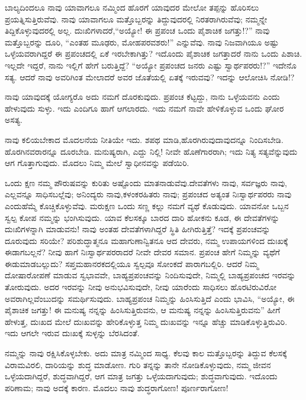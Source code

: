 ಬಾಲ್ಯದಿಂದಲೂ ನಾವು ಯಾವಾಗಲೂ ನಮ್ಮಿಂದ ಹೊರಗೆ ಯಾವುದರ ಮೇಲೋ ತಪ್ಪನ್ನು ಹೊರಿಸಲು ಪ್ರಯತ್ನಿಸುತ್ತಿರುವೆವು. ನಾವು ಯಾವಾಗಲೂ ಮತ್ತೊಬ್ಬರನ್ನು ತಿದ್ದುವುದರಲ್ಲಿ ನಿರತರಾಗಿರುವೆವು; ನಮ್ಮನ್ನೇ ತಿದ್ದಿಕೊಳ್ಳುವುದರಲ್ಲಿ ಅಲ್ಲ. ದುಃಖಿಗಳಾದರೆ,\break “ಅಯ್ಯೋ! ಈ ಪ್ರಪಂಚ ಒಂದು ಪೈಶಾಚಿಕ ಜಗತ್ತು!?” ನಾವು ಮತ್ತೊಬ್ಬರನ್ನು ದೂರಿ, “ಎಂತಹ ಮೂಢರು, ಮೋಹಪರವಶರು!'' ಎನ್ನುವೆವು. ನಾವು ನಿಜವಾಗಿಯೂ ಅಷ್ಟು ಒಳ್ಳೆಯವರಾಗಿದ್ದರೆ ಈ ಪ್ರಪಂಚದಲ್ಲಿ ಏಕೆ ಇರಬೇಕಾಗಿತ್ತು? ಇದೊಂದು ಪೈಶಾಚಿಕ ಜಗತ್ತಾದರೆ ನಾನು ಒಂದು ಪಿಶಾಚಿ. ಇಲ್ಲದೇ ಇದ್ದರೆ, ನಾನು ಇಲ್ಲಿಗೆ ಹೇಗೆ ಬರುತ್ತಿದ್ದೆ? “ಅಯ್ಯೋ ಪ್ರಪಂಚದ ಜನರು ಎಷ್ಟು ಸ್ವಾರ್ಥಪರರು!?” ಇದೇನೊ ಸತ್ಯ. ಆದರೆ ನಾವು ಅವರಿಗಿಂತ ಮೇಲಾದರೆ ಅವರ ಜೊತೆಯಲ್ಲಿ ಏತಕ್ಕೆ ಇರುವವು? ಇದನ್ನು ಆಲೋಚಿಸಿ ನೋಡಿ!?

ನಾವು ಯಾವುದಕ್ಕೆ ಯೋಗ್ಯರೊ ಅದು ನಮಗೆ ದೊರಕುವುದು. ಪ್ರಪಂಚ ಕೆಟ್ಟದ್ದು, ನಾನು ಒಳ್ಳೆಯವನು ಎಂದು ಹೇಳುವುದು ಸುಳ್ಳು. ಇದು ಎಂದಿಗೂ ಹಾಗೆ ಆಗಲಾರದು. ಇದು ನಮಗೆ ನಾವೇ ಹೇಳಿಕೊಳ್ಳುವ ಒಂದು ಘೋರ ಅಸತ್ಯ.

ನಾವು ಕಲಿಯಬೇಕಾದ ಮೊದಲನೆಯ ನೀತಿಯೇ ಇದು. ಶಪಥ ಮಾಡಿ,\break ಹೊರಗಿರುವುದಾವುದನ್ನೂ ನಿಂದಿಸಬೇಡಿ. ಹೊರಗಿನವರಾರನ್ನೂ ದೂರಬೇಡಿ. ಮನುಷ್ಯರಾಗಿ, ಎದ್ದು ನಿಲ್ಲಿ! ನೀವೇ ಹೊಣೆಗಾರರಾಗಿ; ಇದು ನಿತ್ಯ ಸತ್ಯವೆನ್ನುವುದು ಆಗ ಗೊತ್ತಾಗುವುದು. ಮೊದಲು ನಿಮ್ಮ ಮೇಲೆ ಸ್ವಾಧೀನವನ್ನು ಪಡೆಯಿರಿ.

ಒಂದು ಕ್ಷಣ ನಮ್ಮ ಪೌರುಷವನ್ನು ಕುರಿತು ಅಷ್ಟೊಂದು ಮಾತನಾಡುವೆವು.\break ದೇವತೆಗಳು ನಾವು, ಸರ್ವಜ್ಞರು ನಾವು, ಎಲ್ಲವನ್ನೂ ಸಾಧಿಸಬಲ್ಲೆವು; ಅನಿಂದ್ಯರು ನಾವು,\break ಕಳಂಕರಹಿತರು ನಾವು; ಪ್ರಪಂಚದ ಅತ್ಯಂತ ನಿಃಸ್ವಾರ್ಥಪರರು ನಾವು ಎಂದು\break ಹೆಮ್ಮೆ ಕೊಚ್ಚಿಕೊಳ್ಳುವೆವು. ಮರುಕ್ಷಣ ಒಂದು ಸಣ್ಣ ಕಲ್ಲು ನಮಗೆ ವ್ಯಥೆ ಕೊಡುವುದು. ಯಾವನೋ ಒಬ್ಬನ ಸ್ವಲ್ಪ ಕೋಪ ನಮ್ಮನ್ನು ಭಂಗಿಸುವುದು. ಯಾವ ಕೆಲಸಕ್ಕೂ ಬಾರದ ದಾರಿ ಹೋಕನು ಕೂಡ, ಈ ದೇವತೆಗಳನ್ನು ದುಃಖಿಗಳನ್ನಾಗಿ ಮಾಡುವನು! ನಾವು ಅಂತಹ ದೇವತೆಗಳಾಗಿದ್ದರೆ ಸ್ಥಿತಿ ಹೀಗಿರುತ್ತಿತ್ತೆ? ಇದಕ್ಕೆ ಪ್ರಪಂಚವನ್ನು ದೂರುವುದು ಸರಿಯೇ? ಪರಿಶುದ್ಧಾತ್ಮನೂ ಮಹಾಗುಣಾನ್ವಿತನೂ ಆದ ದೇವರು, ನಮ್ಮ ಉಪಾಯಗಳಿಂದ ದುಃಖಕ್ಕೆ ಈಡಾಗಬಲ್ಲನೆ? ನೀವು ಹಾಗೆ ನಿಃಸ್ವಾರ್ಥಪರರಾದರೆ ನೀವೇ ದೇವರ ಸಮಾನ. ಪ್ರಪಂಚ ಹೇಗೆ ನಿಮ್ಮನ್ನು ವ್ಯಥೆಗೆ ಈಡುಮಾಡಬಲ್ಲುದು? ಸಪ್ತಮಹಾನರಕದಲ್ಲಿಯೂ ಸ್ವಲ್ಪವೂ ಸೋಂಕದೆ ಪಾರಾಗಬಲ್ಲಿರಿ. ಆದರೆ ನಿಮ್ಮ ದೋಷಾರೋಪಣೆ ಮಾಡುವ ಸ್ವಭಾವವೇ, ಬಾಹ್ಯಪ್ರಪಂಚವನ್ನು ನಿಂದಿಸುವುದೇ, ನಿಮ್ಮಲ್ಲಿ ಬಾಹ್ಯಪ್ರಪಂಚದ ಇರವನ್ನು ತೋರುವುದು. ಅದರ ಇರವನ್ನು ನೀವು ಅನುಭವಿಸುವುದೇ, ನೀವು ಯಾರೆಂದು ಸಾಧಿಸಲು ಹೊರಟಿರುವಿರೋ ಅವರಾಗಿಲ್ಲವೆಂಬುದನ್ನು ಸಮರ್ಥಿಸುವುದು. ಬಾಹ್ಯಪ್ರಪಂಚ ನಿಮ್ಮನ್ನು ಹಿಂಸಿಸುತ್ತಿದೆ ಎಂದು ಭಾವಿಸಿ, “ಅಯ್ಯೋ, ಈ ಪೈಶಾಚಿಕ ಜಗತ್ತು! ಈ ಮನುಷ್ಯ ನನ್ನನ್ನು ಹಿಂಸಿಸುತ್ತಿರುವನು, ಆ ಮನುಷ್ಯ ನನ್ನನ್ನು ಹಿಂಸಿಸುತ್ತಿರುವನು” ಹೀಗೆ ಹೇಳುತ್ತ, ದುಃಖದ ಮೇಲೆ ದುಃಖವನ್ನು ಹೇರಿಕೊಳ್ಳುತ್ತ ನಿಮ್ಮ ದುಃಖವನ್ನು ಇನ್ನೂ ಹೆಚ್ಚು ಮಾಡಿಕೊಳ್ಳುತ್ತಿರುವಿರಿ. ಇದು ಆಗಲೇ ಇರುವ ದುಃಖಕ್ಕೆ ಸುಳ್ಳನ್ನು ಬೆರಸಿದಂತೆ.

ನಮ್ಮನ್ನು ನಾವು ರಕ್ಷಿಸಿಕೊಳ್ಳಬೇಕು. ಅದು ಮಾತ್ರ ನಮ್ಮಿಂದ ಸಾಧ್ಯ. ಕೆಲವು ಕಾಲ ಮತ್ತೊಬ್ಬರನ್ನು ತಿದ್ದುವ ಕೆಲಸಕ್ಕೆ ವಿರಾಮವಿರಲಿ, ದಾರಿಯನ್ನು ಶುದ್ಧ ಮಾಡೋಣ. ಗುರಿ ತನ್ನನ್ನು ತಾನೇ ನೋಡಿಕೊಳ್ಳುವುದು, ನಮ್ಮ ಜೀವನ ಒಳ್ಳೆಯದಾಗಿದ್ದರೆ, ಶುದ್ಧವಾಗಿದ್ದರೆ, ಆಗ ಮಾತ್ರ ಜಗತ್ತು ಒಳ್ಳೆಯದಾಗುವುದು; ಶುದ್ಧವಾಗುವುದು. ಇದೊಂದು ಪರಿಣಾಮ; ನಾವು ಅದಕ್ಕೆ ಕಾರಣ. ಮೊದಲು ನಾವು ಶುದ್ಧರಾಗೋಣ! ಪೂರ್ಣರಾಗೋಣ!

